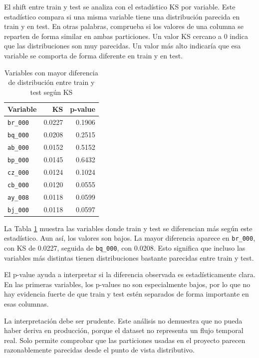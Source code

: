 \documentclass[11pt,a4paper]{article}
\begin{document}
El shift entre train y test se analiza con el estadístico KS por variable. Este estadístico compara si una misma variable tiene una distribución parecida en train y en test. En otras palabras, comprueba si los valores de una columna se reparten de forma similar en ambas particiones. Un valor KS cercano a 0 indica que las distribuciones son muy parecidas. Un valor más alto indicaría que esa variable se comporta de forma diferente en train y en test.

\begin{table}[H]
\centering
\caption{Variables con mayor diferencia de distribución entre train y test según KS}
\label{tab_shift_ks}
\small
\begin{tabular}{@{}lrr@{}}
\toprule
\textbf{Variable} & \textbf{KS} & \textbf{p-value}\\
\midrule
\texttt{br\_000} & 0.0227 & 0.1906\\
\texttt{bq\_000} & 0.0208 & 0.2515\\
\texttt{ab\_000} & 0.0152 & 0.5152\\
\texttt{bp\_000} & 0.0145 & 0.6432\\
\texttt{cz\_000} & 0.0124 & 0.1024\\
\texttt{cb\_000} & 0.0120 & 0.0555\\
\texttt{ay\_008} & 0.0118 & 0.0599\\
\texttt{bj\_000} & 0.0118 & 0.0597\\
\bottomrule
\end{tabular}
\end{table}

La Tabla \ref{tab_shift_ks} muestra las variables donde train y test se diferencian más según este estadístico. Aun así, los valores son bajos. La mayor diferencia aparece en \texttt{br\_000}, con KS de 0.0227, seguida de \texttt{bq\_000}, con 0.0208. Esto significa que incluso las variables más distintas tienen distribuciones bastante parecidas entre train y test.

El p-value ayuda a interpretar si la diferencia observada es estadísticamente clara. En las primeras variables, los p-values no son especialmente bajos, por lo que no hay evidencia fuerte de que train y test estén separados de forma importante en esas columnas.

La interpretación debe ser prudente. Este análisis no demuestra que no pueda haber deriva en producción, porque el dataset no representa un flujo temporal real. Solo permite comprobar que las particiones usadas en el proyecto parecen razonablemente parecidas desde el punto de vista distributivo.
\end{document}
